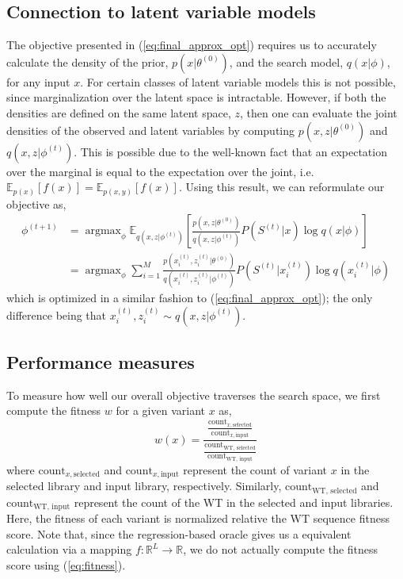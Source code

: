 \documentclass{article}
\DeclareMathOperator*{\argmax}{argmax}
\begin{document}
\subsection{Connection to latent variable models}
\label{sec:methods-latent_variable_models}
The objective presented in (\ref{eq:final_approx_opt}) requires us to accurately
calculate the density of the prior, $p(x|\theta^{(0)})$, and the search model,
$q(x|\phi)$, for any input $x$. For certain classes of latent variable models
this is not possible, since marginalization over the latent space is
intractable. However, if both the densities are defined on the same latent
space, $z$, then one can evaluate the joint densities of the observed and latent
variables by computing $p(x,z|\theta^{(0)})$ and $q(x,z|\phi^{(t)})$. This is
possible due to the well-known fact that an expectation over the marginal is
equal to the expectation over the joint, i.e. $\mathbb{E}_{p(x)}[f(x)] =
\mathbb{E}_{p(x,y)}[f(x)]$. Using this result, we can reformulate our objective
as,
%
\begin{align}
  \phi^{(t+1)}  &= \argmax_{\phi} \mathbb{E}_{q(x,z|\phi^{(t)})} \left[
                    \frac{p(x,z|\theta^{(0)})}{q(x,z|\phi^{(t)})} P(S^{(t)}|x)
                    \log q(x|\phi) \right] \label{eq:latent_exact_opt} \\
                &= \argmax_{\phi} \sum_{i=1}^{M} \frac{p(x_{i}^{(t)},z_{i}^{(t)}
                    |\theta^{(0)})}{q(x_{i}^{(t)}, z_{i}^{(t)}|\phi^{(t)})} 
                    P(S^{(t)} | x_{i}^{(t)}) \log q(x_{i}^{(t)} | \phi)
                    \label{eq:latent_approx_opt}
\end{align}
%
which is optimized in a similar fashion to (\ref{eq:final_approx_opt}); the only
difference being that $x_{i}^{(t)}, z_{i}^{(t)} \sim q(x,z|\phi^{(t)})$.


\subsection{Performance measures}
\label{sec:methods-performance_measures}
To measure how well our overall objective traverses the search space, we first
compute the fitness $w$ for a given variant $x$ as,
%
\begin{equation}
  w(x) = \frac{\frac{\text{count}_{x,\text{selected}}}{\text{count}_{x,\text{input}}}}
    {\frac{\text{count}_{\text{WT, selected}}}{\text{count}_{\text{WT, input}}}}
  \label{eq:fitness}
\end{equation}
%
where $\text{count}_{x,\text{selected}}$ and $\text{count}_{x,\text{input}}$
represent the count of variant $x$ in the selected library and input library,
respectively. Similarly, $\text{count}_{\text{WT, selected}}$ and
$\text{count}_{\text{WT, input}}$ represent the count of the WT in the selected
and input libraries. Here, the fitness of each variant is normalized relative
the WT sequence fitness score. Note that, since the regression-based oracle
gives us a equivalent calculation via a mapping $f: \mathbb{R}^L \to
\mathbb{R}$, we do not actually compute the fitness score using
(\ref{eq:fitness}).
\end{document}
